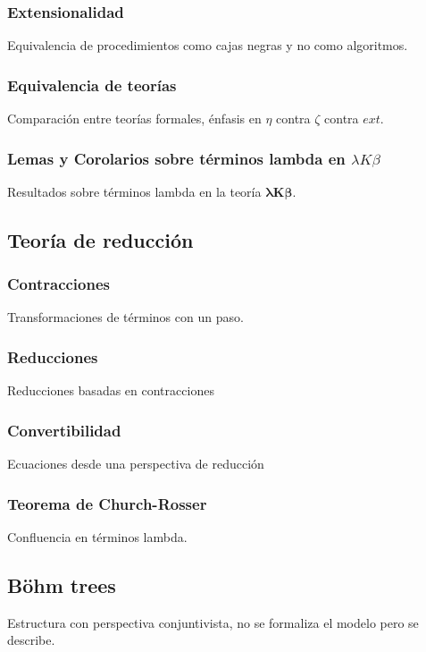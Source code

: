 \subsubsection{Extensionalidad}

Equivalencia de procedimientos como cajas negras y no como algoritmos.

\subsubsection{Equivalencia de teorías}

Comparación entre teorías formales, énfasis en \(\eta\) contra \(\zeta\) contra \(ext\).

\subsubsection{Lemas y Corolarios sobre términos lambda en \(\lambda K \beta\)}

Resultados sobre términos lambda en la teoría \(\boldsymbol{\lambda K \beta}\).

\subsection{Teoría de reducción}

\subsubsection{Contracciones}

Transformaciones de términos con un paso.

\subsubsection{Reducciones}

Reducciones basadas en contracciones

\subsubsection{Convertibilidad}

Ecuaciones desde una perspectiva de reducción

\subsubsection{Teorema de Church-Rosser}

Confluencia en términos lambda.

\subsection{Böhm trees}

Estructura con perspectiva conjuntivista, no se formaliza el modelo pero se
describe.

